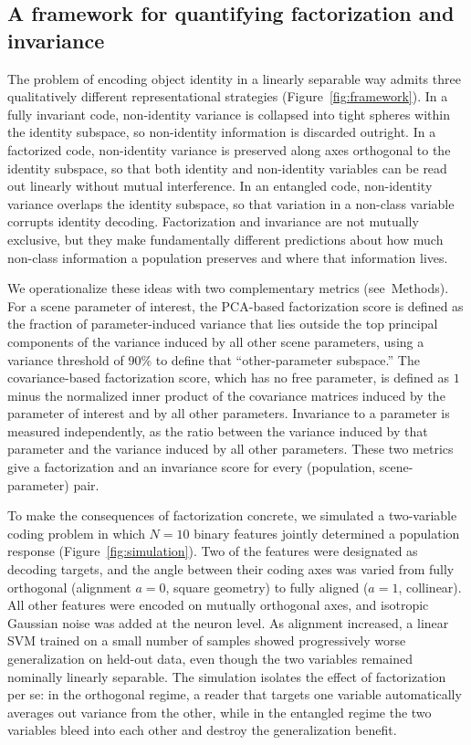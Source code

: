 \documentclass[11pt]{article}
\begin{document}
\subsection{A framework for quantifying factorization and invariance}

The problem of encoding object identity in a linearly separable way admits
three qualitatively different representational strategies
(Figure~\ref{fig:framework}). In a fully invariant code, non-identity
variance is collapsed into tight spheres within the identity subspace, so
non-identity information is discarded outright. In a factorized code,
non-identity variance is preserved along axes orthogonal to the identity
subspace, so that both identity and non-identity variables can be read out
linearly without mutual interference. In an entangled code, non-identity
variance overlaps the identity subspace, so that variation in a non-class
variable corrupts identity decoding. Factorization and invariance are not
mutually exclusive, but they make fundamentally different predictions about
how much non-class information a population preserves and where that
information lives.

We operationalize these ideas with two complementary metrics
(see~Methods). For a scene parameter of interest, the PCA-based factorization
score is defined as the fraction of parameter-induced variance that lies
outside the top principal components of the variance induced by all other
scene parameters, using a variance threshold of 90\% to define that
``other-parameter subspace.'' The covariance-based factorization score,
which has no free parameter, is defined as \(1\) minus the normalized inner
product of the covariance matrices induced by the parameter of interest and
by all other parameters. Invariance to a parameter is measured independently,
as the ratio between the variance induced by that parameter and the variance
induced by all other parameters. These two metrics give a factorization and
an invariance score for every (population, scene-parameter) pair.

To make the consequences of factorization concrete, we simulated a
two-variable coding problem in which \(N=10\) binary features jointly
determined a population response (Figure~\ref{fig:simulation}). Two of the
features were designated as decoding targets, and the angle between their
coding axes was varied from fully orthogonal (alignment \(a=0\), square
geometry) to fully aligned (\(a=1\), collinear). All other features were
encoded on mutually orthogonal axes, and isotropic Gaussian noise was added
at the neuron level. As alignment increased, a linear SVM trained on a
small number of samples showed progressively worse generalization on
held-out data, even though the two variables remained nominally linearly
separable. The simulation isolates the effect of factorization per se: in
the orthogonal regime, a reader that targets one variable automatically
averages out variance from the other, while in the entangled regime the two
variables bleed into each other and destroy the generalization benefit.
\end{document}
